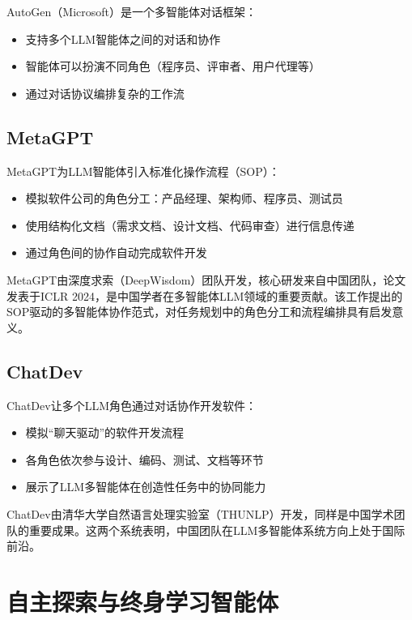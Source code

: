 AutoGen（Microsoft）是一个多智能体对话框架：
\begin{itemize}
  \item 支持多个LLM智能体之间的对话和协作
  \item 智能体可以扮演不同角色（程序员、评审者、用户代理等）
  \item 通过对话协议编排复杂的工作流
\end{itemize}

\subsection{MetaGPT}

MetaGPT为LLM智能体引入标准化操作流程（SOP）：
\begin{itemize}
  \item 模拟软件公司的角色分工：产品经理、架构师、程序员、测试员
  \item 使用结构化文档（需求文档、设计文档、代码审查）进行信息传递
  \item 通过角色间的协作自动完成软件开发
\end{itemize}

\begin{remark}
MetaGPT由深度求索（DeepWisdom）团队开发，核心研发来自中国团队，论文发表于ICLR 2024，是中国学者在多智能体LLM领域的重要贡献。该工作提出的SOP驱动的多智能体协作范式，对任务规划中的角色分工和流程编排具有启发意义。
\end{remark}

\subsection{ChatDev}

ChatDev让多个LLM角色通过对话协作开发软件：
\begin{itemize}
  \item 模拟``聊天驱动''的软件开发流程
  \item 各角色依次参与设计、编码、测试、文档等环节
  \item 展示了LLM多智能体在创造性任务中的协同能力
\end{itemize}

\begin{remark}
ChatDev由清华大学自然语言处理实验室（THUNLP）开发，同样是中国学术团队的重要成果。这两个系统表明，中国团队在LLM多智能体系统方向上处于国际前沿。
\end{remark}

\section{自主探索与终身学习智能体 \self}

